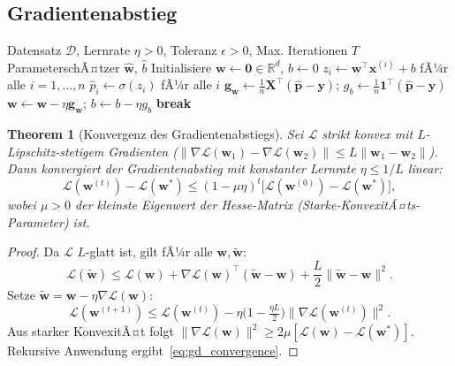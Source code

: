 ﻿\documentclass[12pt, a4paper]{article}
\newtheorem{theorem}{Theorem}[section]
\theoremstyle{definition}
\theoremstyle{remark}
\newcommand{\R}{\mathbb{R}}
\newcommand{\sigmoid}{\sigma}
\newcommand{\vw}{\bm{w}}
\newcommand{\vx}{\bm{x}}
\newcommand{\vy}{\bm{y}}
\newcommand{\vX}{\bm{X}}
\newcommand{\vp}{\hat{\bm{p}}}
\newcommand{\T}{\top}
\begin{document}
\subsection{Gradientenabstieg}

\begin{algorithm}[H]
  \caption{Batch-Gradientenabstieg fÃ¼r logistische Regression}
  \label{alg:gd}
  \begin{algorithmic}[1]
    \Require Datensatz $\mathcal{D}$, Lernrate $\eta > 0$, Toleranz $\epsilon > 0$, Max. Iterationen $T$
    \Ensure ParameterschÃ¤tzer $\hat{\vw}$, $\hat{b}$
    \State Initialisiere $\vw \leftarrow \mathbf{0} \in \R^d$, $b \leftarrow 0$
      \State $z_i \leftarrow \vw^\T\vx^{(i)}+b$ fÃ¼r alle $i = 1,\ldots,n$
      \State $\hat{p}_i \leftarrow \sigmoid(z_i)$ fÃ¼r alle $i$
      \State $\mathbf{g}_{\vw} \leftarrow \frac{1}{n}\vX^\T(\vp-\vy)$; \quad $g_b \leftarrow \frac{1}{n}\mathbf{1}^\T(\vp-\vy)$
      \State $\vw \leftarrow \vw - \eta \mathbf{g}_{\vw}$; \quad $b \leftarrow b - \eta g_b$
      \If{$\|\mathbf{g}_{\vw}\|_2 < \epsilon$} \textbf{break} \EndIf
    \EndFor
  \end{algorithmic}
\end{algorithm}

\begin{theorem}[Konvergenz des Gradientenabstiegs]
  \label{thm:gd_convergence}
  Sei $\mathcal{L}$ strikt konvex mit $L$-Lipschitz-stetigem Gradienten
  ($\|\nabla\mathcal{L}(\vw_1)-\nabla\mathcal{L}(\vw_2)\|\leq L\|\vw_1-\vw_2\|$).
  Dann konvergiert der Gradientenabstieg mit konstanter Lernrate $\eta \leq 1/L$ linear:
  \begin{equation}
    \mathcal{L}(\vw^{(t)}) - \mathcal{L}(\vw^*) \leq (1-\mu\eta)^t \bigl[\mathcal{L}(\vw^{(0)}) - \mathcal{L}(\vw^*)\bigr],
    \label{eq:gd_convergence}
  \end{equation}
  wobei $\mu > 0$ der kleinste Eigenwert der Hesse-Matrix (Starke-KonvexitÃ¤ts-Parameter) ist.
\end{theorem}

\begin{proof}
  Da $\mathcal{L}$ $L$-glatt ist, gilt fÃ¼r alle $\vw, \tilde{\vw}$:
  \[
    \mathcal{L}(\tilde{\vw}) \leq \mathcal{L}(\vw) + \nabla\mathcal{L}(\vw)^\T(\tilde{\vw}-\vw)
    + \frac{L}{2}\|\tilde{\vw}-\vw\|^2.
  \]
  Setze $\tilde{\vw} = \vw - \eta\nabla\mathcal{L}(\vw)$:
  \[
    \mathcal{L}(\vw^{(t+1)}) \leq \mathcal{L}(\vw^{(t)}) - \eta\bigl(1-\tfrac{\eta L}{2}\bigr)
    \|\nabla\mathcal{L}(\vw^{(t)})\|^2.
  \]
  Aus starker KonvexitÃ¤t folgt $\|\nabla\mathcal{L}(\vw)\|^2 \geq 2\mu[\mathcal{L}(\vw)-\mathcal{L}(\vw^*)]$.
  Rekursive Anwendung ergibt~\eqref{eq:gd_convergence}. 
\end{proof}
\end{document}

